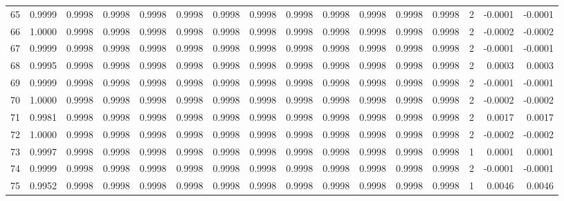 \begin{tabular}{lrrrrrrrrrrrrrrr}
65  &      0.9999 &  0.9998 &  0.9998 &  0.9998 &  0.9998 &  0.9998 &  0.9998 &  0.9998 &  0.9998 &  0.9998 &   0.9998 &     0.9998 &      2 &                   -0.0001 &                    -0.0001 \\
66  &      1.0000 &  0.9998 &  0.9998 &  0.9998 &  0.9998 &  0.9998 &  0.9998 &  0.9998 &  0.9998 &  0.9998 &   0.9998 &     0.9998 &      2 &                   -0.0002 &                    -0.0002 \\
67  &      0.9999 &  0.9998 &  0.9998 &  0.9998 &  0.9998 &  0.9998 &  0.9998 &  0.9998 &  0.9998 &  0.9998 &   0.9998 &     0.9998 &      2 &                   -0.0001 &                    -0.0001 \\
68  &      0.9995 &  0.9998 &  0.9998 &  0.9998 &  0.9998 &  0.9998 &  0.9998 &  0.9998 &  0.9998 &  0.9998 &   0.9998 &     0.9998 &      2 &                    0.0003 &                     0.0003 \\
69  &      0.9999 &  0.9998 &  0.9998 &  0.9998 &  0.9998 &  0.9998 &  0.9998 &  0.9998 &  0.9998 &  0.9998 &   0.9998 &     0.9998 &      2 &                   -0.0001 &                    -0.0001 \\
70  &      1.0000 &  0.9998 &  0.9998 &  0.9998 &  0.9998 &  0.9998 &  0.9998 &  0.9998 &  0.9998 &  0.9998 &   0.9998 &     0.9998 &      2 &                   -0.0002 &                    -0.0002 \\
71  &      0.9981 &  0.9998 &  0.9998 &  0.9998 &  0.9998 &  0.9998 &  0.9998 &  0.9998 &  0.9998 &  0.9998 &   0.9998 &     0.9998 &      2 &                    0.0017 &                     0.0017 \\
72  &      1.0000 &  0.9998 &  0.9998 &  0.9998 &  0.9998 &  0.9998 &  0.9998 &  0.9998 &  0.9998 &  0.9998 &   0.9998 &     0.9998 &      2 &                   -0.0002 &                    -0.0002 \\
73  &      0.9997 &  0.9998 &  0.9998 &  0.9998 &  0.9998 &  0.9998 &  0.9998 &  0.9998 &  0.9998 &  0.9998 &   0.9998 &     0.9998 &      1 &                    0.0001 &                     0.0001 \\
74  &      0.9999 &  0.9998 &  0.9998 &  0.9998 &  0.9998 &  0.9998 &  0.9998 &  0.9998 &  0.9998 &  0.9998 &   0.9998 &     0.9998 &      2 &                   -0.0001 &                    -0.0001 \\
75  &      0.9952 &  0.9998 &  0.9998 &  0.9998 &  0.9998 &  0.9998 &  0.9998 &  0.9998 &  0.9998 &  0.9998 &   0.9998 &     0.9998 &      1 &                    0.0046 &                     0.0046 \\

\end{tabular}
